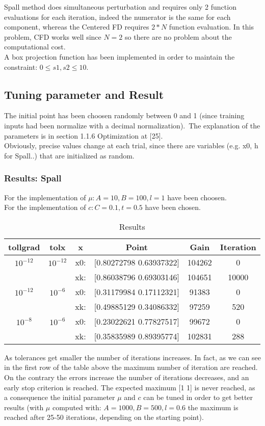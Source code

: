 \documentclass{article}
\begin{document}
Spall method does simultaneous perturbation and requires only 2 function evaluations for each iteration, indeed the
numerator is the same for each component, whereas the Centered FD requires $2*N$ function evaluation.
In this problem, CFD works well since $N=2$ so there are no problem about the computational cost.\\ A box projection function has been implemented in order to maintain the constraint: $0 \leq{s1,s2}\leq10$.
\subsection{Tuning parameter and Result}
The initial point has been choosen randomly between 0 and 1 (since training inputs had been normalize with a decimal normalization).\
The explanation of the parameters is in section 1.1.6 Optimization at [25].\\
Obviously, precise values change at each trial, since there are variables (e.g. x0, h for Spall..) that
are initialized as random.

\subsubsection{Results: Spall}
For the implementation of $\mu: {A = 10,B = 100,l = 1}$  have been choosen.\\
For the implementation of $c: C = 0.1,t = 0.5$ have been chosen.

\begin{table}[h!]
\centering
 \begin{tabular}{|c c c c c c|} 
 \hline
 tollgrad & tolx & x & Point & Gain & Iteration \\ [0.5ex] 
 \hline\hline
 $10^{-12}$ & $10^{-12}$ & x0: & [0.80272798 0.63937322] & 104262 & 0 \\ 
  &  & xk: & [0.86038796 0.69303146]  & 104651 & 10000 \\
  \hline
  $10^{-12}$ & $10^{-6}$ &  x0: &[0.31179984 0.17112321] & 91383 & 0 \\ 
  &  & xk: & [0.49885129 0.34086332] & 97259 & 520 \\
  \hline
   $10^{-8}$ & $10^{-6}$ & x0: &[0.23022621 0.77827517] & 99672 & 0 \\ 
  &  &xk: & [0.35835989 0.89395774] & 102831 & 288 \\
 \hline
 \end{tabular}
 \caption{Results}
\label{table:2}
\end{table}
As tolerances get smaller the number of iterations increases. In fact, as we can see in the first row of the table above the maximum number of iteration are reached. On the contrary the errors increase the number of iterations decreases, and an early stop criterion is reached.
The expected maximum [1 1] is never reached, as a consequence the initial parameter $\mu$ and $c$ can be tuned in order to get better results (with $\mu$ computed with: $A=1000, B =500, l = 0.6$ the maximum is reached after 25-50 iterations, depending on the starting point).
\end{document}
